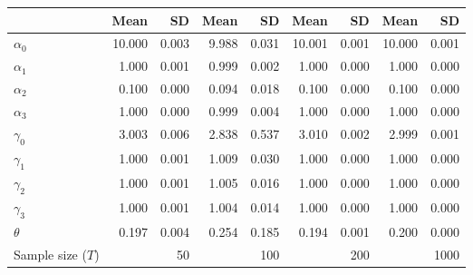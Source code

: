 
\begin{tabular}[t]{lrrrrrrrr}
\toprule
  & Mean & SD & Mean  & SD  & Mean   & SD   & Mean    & SD   \\
\midrule
$\alpha_{0}$ & 10.000 & 0.003 & 9.988 & 0.031 & 10.001 & 0.001 & 10.000 & 0.001\\
$\alpha_{1}$ & 1.000 & 0.001 & 0.999 & 0.002 & 1.000 & 0.000 & 1.000 & 0.000\\
$\alpha_{2}$ & 0.100 & 0.000 & 0.094 & 0.018 & 0.100 & 0.000 & 0.100 & 0.000\\
$\alpha_{3}$ & 1.000 & 0.000 & 0.999 & 0.004 & 1.000 & 0.000 & 1.000 & 0.000\\
$\gamma_{0}$ & 3.003 & 0.006 & 2.838 & 0.537 & 3.010 & 0.002 & 2.999 & 0.001\\
$\gamma_{1}$ & 1.000 & 0.001 & 1.009 & 0.030 & 1.000 & 0.000 & 1.000 & 0.000\\
$\gamma_{2}$ & 1.000 & 0.001 & 1.005 & 0.016 & 1.000 & 0.000 & 1.000 & 0.000\\
$\gamma_{3}$ & 1.000 & 0.001 & 1.004 & 0.014 & 1.000 & 0.000 & 1.000 & 0.000\\
$\theta$ & 0.197 & 0.004 & 0.254 & 0.185 & 0.194 & 0.001 & 0.200 & 0.000\\
Sample size ($T$) &  & 50 &  & 100 &  & 200 &  & 1000\\
\bottomrule
\end{tabular}
